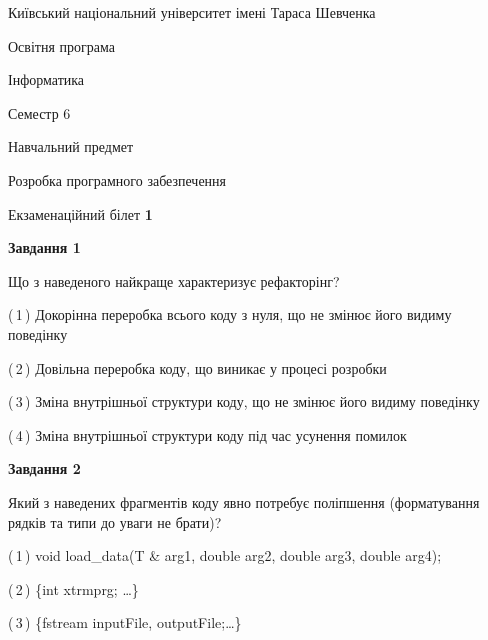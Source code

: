 \documentclass[10pt, ukrainian]{article}
\begin{document}
{{\begin {small}\par
{ \center  Київський національний університет імені Тараса Шевченка \par}
{\parbox {5 cm}{Освітня програма \hfill}{\parbox {7 cm}{Інформатика \hfill}}\parbox {6 cm}{\hfill Семестр 6}}\par
{\parbox {5 cm} {Навчальний предмет \hfill}\parbox {7 cm}{Розробка програмного забезпечення \hfill}\parbox {6cm}{\hfill}\par}\vspace{-7pt} \end{small}}{\center Екзаменаційний білет \No \textbf
{ 1 }\par}}
{
\begin {large}
{\begin {center}\textbf{Завдання 1}\end {center}}\par
Що з наведеного найкраще характеризує рефакторінг?\par
\vspace{2mm}



(\,1\,) Докорінна переробка всього коду з нуля,  що не змінює його видиму поведінку%



(\,2\,) Довільна переробка коду, що виникає у процесі розробки%



(\,3\,) Зміна внутрішньої структури коду, що не змінює його видиму поведінку%



(\,4\,) Зміна внутрішньої структури коду під час усунення помилок%


{\begin {center}\textbf{Завдання 2}\end {center}}\par
Який з наведених фрагментів коду явно потребує поліпшення (форматування рядків та типи до уваги не брати)?\par
\vspace{2mm}



(\,1\,) void load\_data(T \& arg1, double arg2, double arg3, double arg4); %



(\,2\,) \{int xtrmprg; …\}%



(\,3\,) \{fstream inputFile, outputFile;…\} %




\end{large}}
\end{document}
